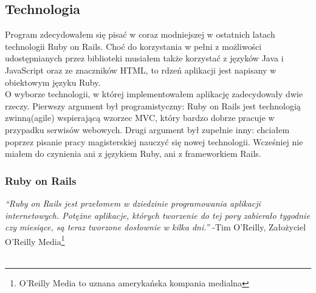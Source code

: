 \documentclass[12pt,leqno]{article}
\begin{document}
\subsection{Technologia}
Program zdecydowałem się pisać w coraz modniejszej w ostatnich latach technologii Ruby on Rails. Choć do korzystania w pełni z możliwości udostępnianych przez biblioteki musiałem także korzystać z języków Java i JavaScript oraz ze znaczników HTML, to rdzeń aplikacji jest napisany w obiektowym języku Ruby.\\
O wyborze technologii, w której implementowałem aplikację zadecydowały dwie rzeczy. Pierwszy argument był programistyczny: Ruby on Rails jest technologią zwinną(agile) wspierającą wzorzec MVC, który bardzo dobrze pracuje w przypadku serwisów webowych. Drugi argument był zupełnie inny: chciałem poprzez pisanie pracy magisterskiej nauczyć się nowej technologii. Wcześniej nie miałem do czynienia ani z językiem Ruby, ani z frameworkiem Rails. 

\subsubsection{Ruby on Rails}
{ \it “Ruby on Rails jest przełomem w dziedzinie programowania aplikacji internetowych.
Potężne aplikacje, których tworzenie do tej pory zabierało tygodnie czy miesiące,
są teraz tworzone dosłownie w kilka dni.” }
-Tim O'Reilly, Założyciel O'Reilly Media\footnote {O'Reilly Media to uznana amerykańska kompania medialna} \\\\
\end{document}
